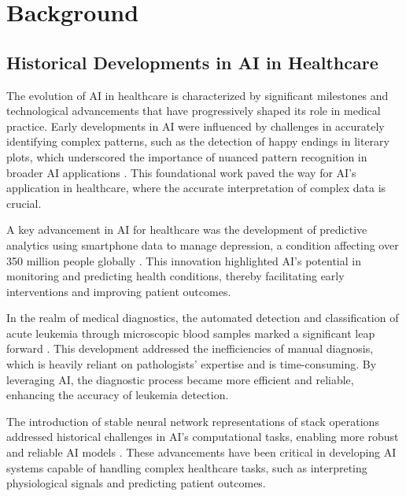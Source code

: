 \section{Background} \label{sec:Background}



\subsection{Historical Developments in AI in Healthcare} \label{subsec:Historical Developments in AI in Healthcare}



The evolution of AI in healthcare is characterized by significant milestones and technological advancements that have progressively shaped its role in medical practice. Early developments in AI were influenced by challenges in accurately identifying complex patterns, such as the detection of happy endings in literary plots, which underscored the importance of nuanced pattern recognition in broader AI applications \cite{jannidis2016analyzingfeaturesdetectionhappy}. This foundational work paved the way for AI's application in healthcare, where the accurate interpretation of complex data is crucial.



A key advancement in AI for healthcare was the development of predictive analytics using smartphone data to manage depression, a condition affecting over 350 million people globally \cite{jeong2016predictiveanalyticsusingsmartphone}. This innovation highlighted AI's potential in monitoring and predicting health conditions, thereby facilitating early interventions and improving patient outcomes.



In the realm of medical diagnostics, the automated detection and classification of acute leukemia through microscopic blood samples marked a significant leap forward \cite{zolfaghari2023surveyautomateddetectionclassification}. This development addressed the inefficiencies of manual diagnosis, which is heavily reliant on pathologists' expertise and is time-consuming. By leveraging AI, the diagnostic process became more efficient and reliable, enhancing the accuracy of leukemia detection.



The introduction of stable neural network representations of stack operations addressed historical challenges in AI's computational tasks, enabling more robust and reliable AI models \cite{stogin2022provablystableneuralnetwork}. These advancements have been critical in developing AI systems capable of handling complex healthcare tasks, such as interpreting physiological signals and predicting patient outcomes.



